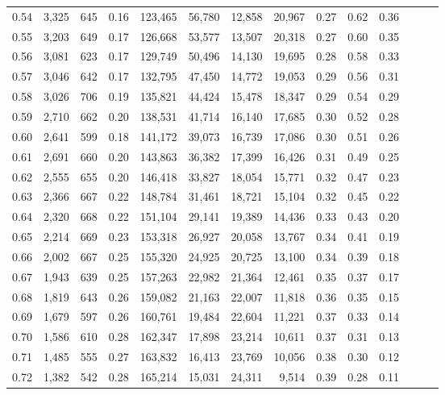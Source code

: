 \begin{tabular}{rrrrrrrrrrrrrr}
0.54 &  3,325 &  645 &  0.16 &  123,465 &   56,780 &  12,858 &  20,967 &  0.27 &  0.62 &      0.36 \\
0.55 &  3,203 &  649 &  0.17 &  126,668 &   53,577 &  13,507 &  20,318 &  0.27 &  0.60 &      0.35 \\
0.56 &  3,081 &  623 &  0.17 &  129,749 &   50,496 &  14,130 &  19,695 &  0.28 &  0.58 &      0.33 \\
0.57 &  3,046 &  642 &  0.17 &  132,795 &   47,450 &  14,772 &  19,053 &  0.29 &  0.56 &      0.31 \\
0.58 &  3,026 &  706 &  0.19 &  135,821 &   44,424 &  15,478 &  18,347 &  0.29 &  0.54 &      0.29 \\
0.59 &  2,710 &  662 &  0.20 &  138,531 &   41,714 &  16,140 &  17,685 &  0.30 &  0.52 &      0.28 \\
0.60 &  2,641 &  599 &  0.18 &  141,172 &   39,073 &  16,739 &  17,086 &  0.30 &  0.51 &      0.26 \\
0.61 &  2,691 &  660 &  0.20 &  143,863 &   36,382 &  17,399 &  16,426 &  0.31 &  0.49 &      0.25 \\
0.62 &  2,555 &  655 &  0.20 &  146,418 &   33,827 &  18,054 &  15,771 &  0.32 &  0.47 &      0.23 \\
0.63 &  2,366 &  667 &  0.22 &  148,784 &   31,461 &  18,721 &  15,104 &  0.32 &  0.45 &      0.22 \\
0.64 &  2,320 &  668 &  0.22 &  151,104 &   29,141 &  19,389 &  14,436 &  0.33 &  0.43 &      0.20 \\
0.65 &  2,214 &  669 &  0.23 &  153,318 &   26,927 &  20,058 &  13,767 &  0.34 &  0.41 &      0.19 \\
0.66 &  2,002 &  667 &  0.25 &  155,320 &   24,925 &  20,725 &  13,100 &  0.34 &  0.39 &      0.18 \\
0.67 &  1,943 &  639 &  0.25 &  157,263 &   22,982 &  21,364 &  12,461 &  0.35 &  0.37 &      0.17 \\
0.68 &  1,819 &  643 &  0.26 &  159,082 &   21,163 &  22,007 &  11,818 &  0.36 &  0.35 &      0.15 \\
0.69 &  1,679 &  597 &  0.26 &  160,761 &   19,484 &  22,604 &  11,221 &  0.37 &  0.33 &      0.14 \\
0.70 &  1,586 &  610 &  0.28 &  162,347 &   17,898 &  23,214 &  10,611 &  0.37 &  0.31 &      0.13 \\
0.71 &  1,485 &  555 &  0.27 &  163,832 &   16,413 &  23,769 &  10,056 &  0.38 &  0.30 &      0.12 \\
0.72 &  1,382 &  542 &  0.28 &  165,214 &   15,031 &  24,311 &   9,514 &  0.39 &  0.28 &      0.11 \\

\end{tabular}
